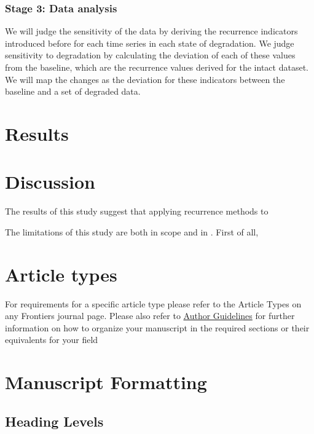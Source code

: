 \documentclass[utf8]{FrontiersinVancouver}
\begin{document}
\subsubsection{Stage 3: Data analysis}

We will judge the sensitivity of the data by deriving the recurrence indicators introduced before for each time series in each state of degradation. We judge sensitivity to degradation by calculating the deviation of each of these values from the baseline, which are the recurrence values derived for the intact dataset. We will map the changes as the deviation for these indicators between the baseline and a set of degraded data.

\section{Results}

\section{Discussion}
The results of this study suggest that applying recurrence methods to 


The limitations of this study are both in scope and in . First of all,   

\section{Article types}

For requirements for a specific article type please refer to the Article Types on any Frontiers journal page. Please also refer to \href{http://home.frontiersin.org/about/author-guidelines#Sections}{Author Guidelines} for further information on how to organize your manuscript in the required sections or their equivalents for your field


\section{Manuscript Formatting}

\subsection{Heading Levels}
\end{document}
